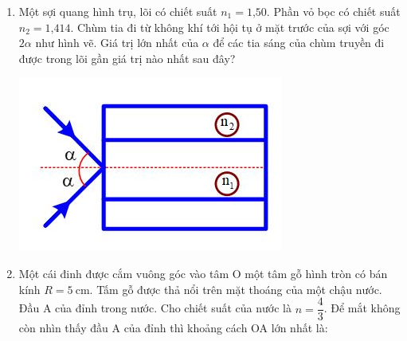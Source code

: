 \begin{enumerate}
{		
}	
	\item{Một sợi quang hình trụ, lõi có chiết suất $n_1 = \text{1,50}$. Phần vỏ bọc có chiết suất $n_2 = \text{1,414}$. Chùm tia đi từ không khí tới hội tụ ở mặt trước của sợi với góc $2\alpha$ như hình vẽ. Giá trị lớn nhất của $\alpha$ để các tia sáng của chùm truyền đi được trong lõi gần giá trị nào nhất sau đây?
		\begin{center}
			\includegraphics[scale=0.6]{../figs/VN11-PH-35-P-023-1-2.JPG}
		\end{center}
}	
	\item{Một cái đinh được cắm vuông góc vào tâm O một tâm gỗ hình tròn có bán kính $R = 5\ \text{cm}$. Tấm gỗ được thả nổi trên mặt thoáng của một chậu nước. Đầu A của đỉnh trong nước. Cho chiết suất của nước là $n = \dfrac{4}{3}$. Để mắt không còn nhìn thấy đầu A của đỉnh thì khoảng cách OA lớn nhất là:
}	
\end{enumerate}

